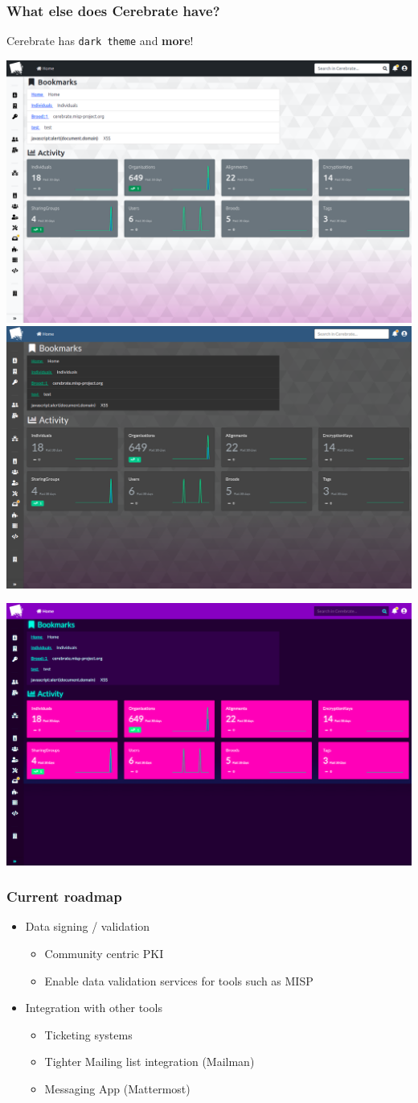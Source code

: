 \begin{frame}
\frametitle{What else does Cerebrate have?}
    Cerebrate has \colorbox{black!90}{\color{white}\texttt{dark theme}} and \textbf{{\color{blue!70}m}{\color{red!70}o}{\color{purple!90}r}{\color{orange!70}e}}!
    \linebreak
    \begin{center}
        \includegraphics[width=0.42\linewidth]{pictures/theme-1.png}
        \includegraphics[width=0.42\linewidth]{pictures/theme-2.png}
    \end{center}
    \begin{center}
        \includegraphics[width=0.42\linewidth]{pictures/theme-3.png}
    \end{center}
\end{frame}

\begin{frame}
\frametitle{Current roadmap}
    \begin{itemize}
        \item Data signing / validation
        \begin{itemize}
            \item Community centric PKI
            \item Enable data validation services for tools such as MISP
        \end{itemize}
        \item Integration with other tools
        \begin{itemize}
            \item Ticketing systems
            \item Tighter Mailing list integration (Mailman)
            \item Messaging App (Mattermost)
        \end{itemize}
    \end{itemize}
\end{frame}

